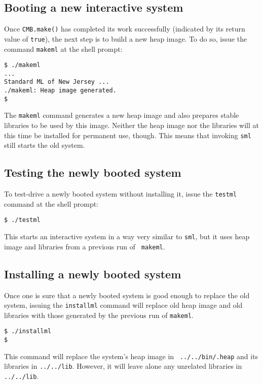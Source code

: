 \subsection{Booting a new interactive system}

Once {\tt CMB.make()} has completed its work successfully (indicated
by its return value of {\tt true}), the next step is to build a new
heap image.  To do so, issue the command {\tt makeml} at the shell
prompt:

\begin{verbatim}
$ ./makeml
...
Standard ML of New Jersey ...
./makeml: Heap image generated.
$
\end{verbatim}

The {\tt makeml} command generates a new heap image and also prepares
stable libraries to be used by this image.  Neither the heap image nor
the libraries will at this time be installed for permanent use,
though.  This means that invoking {\tt sml} still starts the old
system.

\subsection{Testing the newly booted system}

To test-drive a newly booted system without installing it, issue the
{\tt testml} command at the shell prompt:

\begin{verbatim}
$ ./testml
\end{verbatim}

This starts an interactive system in a way very similar to {\tt sml},
but it uses heap image and libraries from a previous run of {\tt
makeml}.

\subsection{Installing a newly booted system}

Once one is sure that a newly booted system is good enough to replace
the old system, issuing the {\tt installml} command will replace old
heap image and old libraries with those generated by the previous run
of {\tt makeml}.

\begin{verbatim}
$ ./installml
$
\end{verbatim}

This command will replace the system's heap image in {\tt
../../bin/.heap} and its libraries in {\tt ../../lib}.  However, it
will leave alone any unrelated libraries in {\tt ../../lib}.

